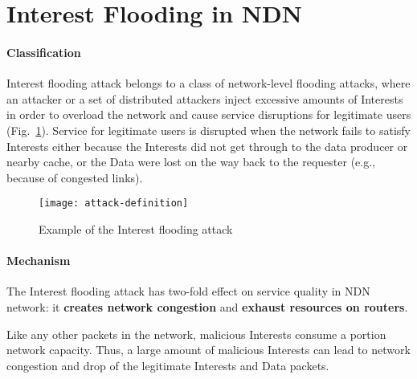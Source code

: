 \section{Interest Flooding in NDN}
\label{sec:interest flooding}



\paragraph{Classification}

Interest flooding attack belongs to a class of network-level flooding attacks, where an attacker or a set of distributed attackers inject excessive amounts of Interests in order to overload the network and cause service disruptions for legitimate users (Fig.~\ref{fig:flooding example}).
%
%
Service for legitimate users is disrupted when the network fails to satisfy Interests either because the Interests did not get through to the data producer or nearby cache, or the Data were lost on the way back to the requester (e.g., because of congested links).

\begin{figure}[htbp]
  \centering
  \texttt{[image: attack-definition]}
  \caption{Example of the Interest flooding attack}
  \label{fig:flooding example}
\end{figure}

\paragraph{Mechanism}

The Interest flooding attack has two-fold effect on service quality in NDN network: it \textbf{creates network congestion} and \textbf{exhaust resources on routers}.

Like any other packets in the network, malicious Interests consume a portion network capacity.
Thus, a large amount of malicious Interests can lead to network congestion and drop of the legitimate Interests and Data packets.


